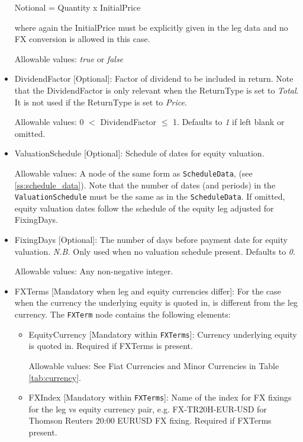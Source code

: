 \begin{itemize}
  Notional = Quantity x InitialPrice

  where again the InitialPrice must be explicitly given in the leg data and no FX conversion is allowed in this case.

  Allowable values:  \emph{true} or  \emph{false}

\item DividendFactor [Optional]: Factor of dividend to be included in return. Note that the DividendFactor is only relevant when the ReturnType is set to  \emph{Total}. It is not used if the ReturnType is set to \emph{Price}.

Allowable values: 0 $<$ DividendFactor $\leq$  1.   Defaults to \emph{1} if left blank or omitted.

\item ValuationSchedule [Optional]: Schedule of dates for equity valuation.

Allowable values: A node of the same form as \lstinline!ScheduleData!, (see \ref{ss:schedule_data}). Note that the number of dates (and periods) in the \lstinline!ValuationSchedule! must be the same as in the \lstinline!ScheduleData!.  If omitted, equity valuation dates follow the schedule of the equity leg adjusted for FixingDays.

\item FixingDays [Optional]: The number of days before payment date for equity valuation. \emph{N.B.} Only used when no valuation schedule present. Defaults to \emph{0}.

Allowable values: Any non-negative integer.

\item FXTerms [Mandatory when leg and equity currencies differ]: For the case when the currency  the underlying equity is quoted in, is different from the leg currency.  The \lstinline!FXTerm! node contains the following elements:
\begin{itemize}
	\item EquityCurrency [Mandatory within \lstinline!FXTerms!]: Currency underlying equity is quoted in. Required if FXTerms is present.

	Allowable values: See Fiat Currencies and Minor Currencies in Table \ref{tab:currency}.

	\item FXIndex [Mandatory within \lstinline!FXTerms!]: Name of the index for FX fixings for the leg vs equity currency pair, e.g. FX-TR20H-EUR-USD for Thomson Reuters 20:00 EURUSD FX fixing. Required if FXTerms present.


\end{itemize}
\end{itemize}
